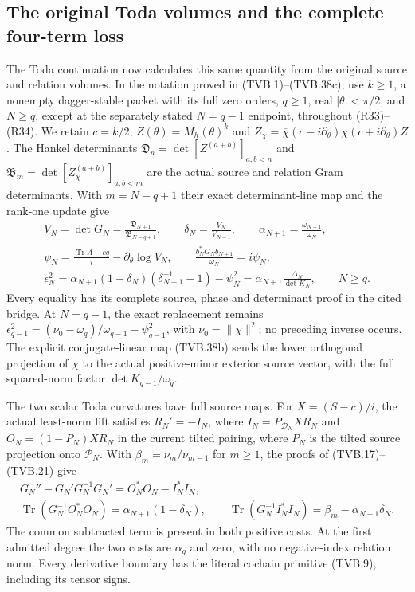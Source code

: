\subsection{The original Toda volumes and the complete four-term loss}

The Toda continuation now calculates this same quantity from the original
source and relation volumes. In the notation proved in (TVB.1)--(TVB.38c),
use $k\ge1$, a nonempty dagger-stable packet with its full zero orders,
$q\ge1$, real $|\theta|<\pi/2$, and $N\ge q$, except at the
separately stated $N=q-1$ endpoint, throughout (R33)--(R34). We
retain $c=k/2$, $Z(\theta)=M_h(\theta)^k$ and
$Z_\chi=\overline\chi(c-i\partial_\theta)\chi(c+i\partial_\theta)Z$.
The Hankel determinants $\mathfrak D_n=\det[Z^{(a+b)}]_{a,b<n}$ and
$\mathfrak B_m=\det[Z_\chi^{(a+b)}]_{a,b<m}$ are the actual source
and relation Gram determinants. With $m=N-q+1$ their exact determinant-line
map and the rank-one update give
\[
\begin{gathered}
 V_N=\det G_N=\frac{\mathfrak D_{N+1}}{\mathfrak B_{N-q+1}},
 \qquad \delta_N=\frac{V_N}{V_{N-1}},\qquad
 \alpha_{N+1}=\frac{\omega_{N+1}}{\omega_N},\\
 \psi_N=\frac{\operatorname{Tr}A-cq}{i}-\partial_\theta\log V_N,
 \qquad \frac{b_N^*G_Nb_{N+1}}{\omega_N}=i\psi_N,\\
 \epsilon_N^2=
 \alpha_{N+1}(1-\delta_N)(\delta_{N+1}^{-1}-1)-\psi_N^2
 =\alpha_{N+1}\frac{\Delta_N}{\det K_N},\qquad N\ge q.
\end{gathered}
\tag{R33}
\]
Every equality has its complete source, phase and determinant proof in
the cited bridge. At $N=q-1$, the exact replacement remains
$\epsilon_{q-1}^2=(\nu_0-\omega_q)/\omega_{q-1}-\psi_{q-1}^2$,
with $\nu_0=\|\chi\|^2$; no preceding inverse occurs. The explicit
conjugate-linear map (TVB.38b) sends the lower orthogonal projection of
$\chi$ to the actual positive-minor exterior source vector, with the
full squared-norm factor $\det K_{q-1}/\omega_q$.

The two scalar Toda curvatures have full source maps. For $X=(S-c)/i$,
the actual least-norm lift satisfies $R_N'=-I_N$, where
$I_N=P_{\mathcal D_N}XR_N$ and $O_N=(1-P_N)XR_N$ in the current
tilted pairing, where $P_N$ is the tilted source projection onto
$\mathcal P_N$. With $\beta_m=\nu_m/\nu_{m-1}$ for $m\ge1$, the
proofs of (TVB.17)--(TVB.21) give
\[
\begin{gathered}
 G_N''-G_N'G_N^{-1}G_N'=O_N^*O_N-I_N^*I_N,\\
 \operatorname{Tr}(G_N^{-1}O_N^*O_N)=\alpha_{N+1}(1-\delta_N),\qquad
 \operatorname{Tr}(G_N^{-1}I_N^*I_N)=\beta_m-\alpha_{N+1}\delta_N.
\end{gathered}
\tag{R34}
\]
The common subtracted term is present in both positive costs. At the
first admitted degree the two costs are $\alpha_q$ and zero, with no
negative-index relation norm. Every derivative boundary has the literal
cochain primitive (TVB.9), including its tensor signs.

